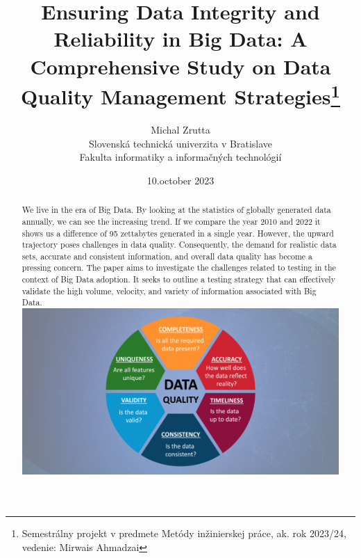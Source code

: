 \documentclass[12pt,twoside,slovak,a4paper]{coursepaper}
\title{Ensuring Data Integrity and Reliability in Big Data: A Comprehensive Study on Data Quality Management Strategies\thanks{Semestrálny projekt v predmete Metódy inžinierskej práce, ak. rok 2023/24, vedenie: Mirwais Ahmadzai}} %
\author{Michal Zrutta\\[2pt]
	{\small Slovenská technická univerzita v Bratislave}\\
	{\small Fakulta informatiky a informačných technológií}\\
	{\small \textt{xzrutta@stuba.sk}}
	}
\date{\small 10.october 2023} %
\begin{document}
\maketitle

\begin{abstract}
We live in the era of Big Data. By looking at the statistics of globally generated data annually, we can 
see the increasing trend. If we compare the year 2010 and 2022 it shows us a difference of 95
zettabytes generated in a single year. However, the upward trajectory poses challenges in data 
quality. Consequently, the demand for realistic data sets, accurate and consistent information, and 
overall data quality has become a pressing concern. The paper aims to investigate the challenges 
related to testing in the context of Big Data adoption. It seeks to outline a testing strategy that can 
effectively validate the high volume, velocity, and variety of information associated with Big Data.\cite{gudivada2015big}\cite{mittal2013trustworthiness}
\includegraphics[scale=0.25]{../1_UUqMUEVRtKnx_mx0k1sf1Q.png}
\end{abstract} 


\end{document}
